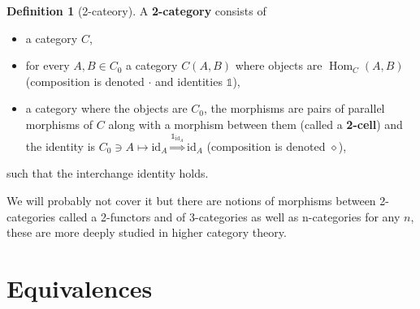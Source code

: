 \documentclass{article}
\theoremstyle{definition}
\newtheorem{defn}[thm]{Definition}
\theoremstyle{remark}
\newcommand{\one}{\mathbb{1}}
\DeclareMathOperator{\Hom}{Hom}
\newcommand{\id}{\text{id}}
\begin{document}
\begin{defn}[2-cateory]
	A \textbf{2-category} consists of
	\begin{itemize}
		\item a category $C$,
		\item for every $A,B \in C_0$ a category $C(A,B)$ where objects are $\Hom_C(A,B)$ (composition is denoted $\cdot$ and identities $\one$),
		\item a category where the objects are $C_0$, the morphisms are pairs of parallel morphisms of $C$ along with a morphism between them (called a \textbf{2-cell}) and the identity is $C_0 \ni A \mapsto \id_A \stackrel{\one_{\id_A}}{\Rightarrow}\id_A$ (composition is denoted $\diamond$),
	\end{itemize} 
	such that the interchange identity holds.
\end{defn}
We will probably not cover it but there are notions of morphisms between 2-categories called a 2-functors and of 3-categories as well as n-categories for any $n$, these are more deeply studied in higher category theory.

\section{Equivalences}
\end{document}
